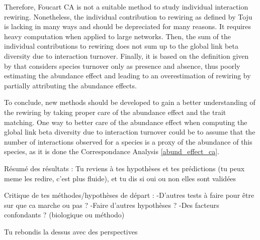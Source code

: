 Therefore, Foucart CA is not a suitable method to study individual interaction rewiring. 
Nonetheless, the individual contribution to rewiring as defined by Toju \cite{toju_interaction_2024} is lacking in many ways and should be depreciated for many reasons. It requires heavy computation when applied to large networks. Then, the sum of the individual contributions to rewiring does not sum up to the global link beta diversity due to interaction turnover. Finally, it is based on the definition given by \cite{poisot_dissimilarity_2012} that considers species turnover only as presence and absence, thus poorly estimating the abundance effect and leading to an overestimation of rewiring by partially attributing the abundance effects.

To conclude, new methods should be developed to gain a better understanding of the rewiring by taking proper care of the abundance effect and the trait matching. One way to better care of the abundance effect when computing the global link beta diversity due to interaction turnover could be to assume that the number of interactions observed for a species is a proxy of the abundance of this species, as it is done the Correspondance Analysis \ref{abund_effect_ca}.















Résumé des résultats : Tu reviens à tes hypothèses et tes prédictions (tu peux meme les redire, c'est plus fluide), et tu dis si oui ou non elles sont validées

Critique de tes méthodes/hypothèses de départ :
-D'autres tests à faire pour être sur que ca marche ou pas ?
-Faire d'autres hypothèses ?
-Des facteurs confondants ? (biologique ou méthodo)

Tu rebondis la dessus avec des perspectives









